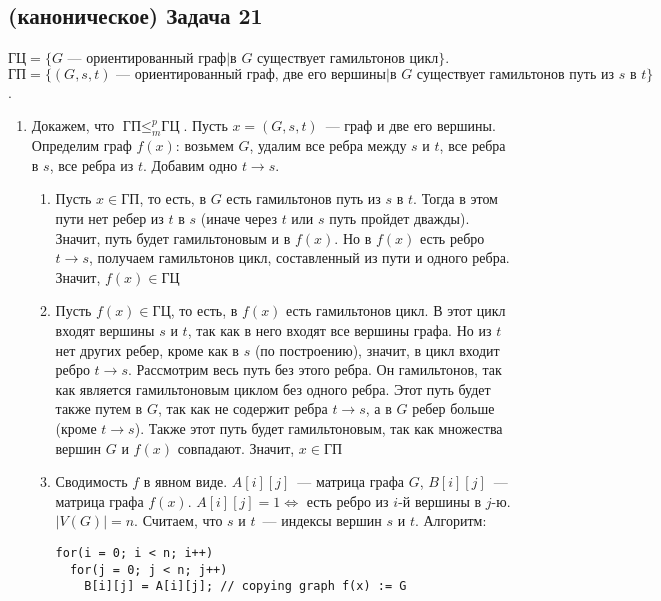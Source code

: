 \documentclass[a4paper]{article}
\def\GC{{\mbox{ГЦ}}}
\def\GP{{\mbox{ГП}}}
\begin{document}
\subsection*{(каноническое) Задача 21}
$\GC=\{G\mbox{~--- ориентированный граф}\big|\mbox{в }G\mbox{ существует гамильтонов цикл}\}$.\newline
$\GP=\{(G,s,t)\mbox{~--- ориентированный граф, две его вершины}\big|\mbox{в }G\mbox{ существует гамильтонов путь из }s\mbox{ в }t\}$.\begin{enumerate}
\item Докажем, что $\GP\leqslant_m^p\GC$. Пусть $x=(G,s,t)$~--- граф и две его вершины. Определим граф $f(x)$: возьмем $G$, удалим все ребра между $s$ и $t$, все ребра в $s$, все ребра из $t$. Добавим одно $t\to s$.\begin{enumerate}
\item Пусть $x\in\GP$, то есть, в $G$ есть гамильтонов путь из $s$ в $t$. Тогда в этом пути нет ребер из $t$ в $s$ (иначе через $t$ или $s$ путь пройдет дважды). Значит, путь будет гамильтоновым и в $f(x)$. Но в $f(x)$ есть ребро $t\to s$, получаем гамильтонов цикл, составленный из пути и одного ребра. Значит, $f(x)\in\GC$
\item Пусть $f(x)\in\GC$, то есть, в $f(x)$ есть гамильтонов цикл. В этот цикл входят вершины $s$ и $t$, так как в него входят все вершины графа. Но из $t$ нет других ребер, кроме как в $s$ (по построению), значит, в цикл входит ребро $t\to s$. Рассмотрим весь путь без этого ребра. Он гамильтонов, так как является гамильтоновым циклом без одного ребра. Этот путь будет также путем в $G$, так как не содержит ребра $t\to s$, а в $G$ ребер больше (кроме $t\to s$). Также этот путь будет гамильтоновым, так как множества вершин $G$ и $f(x)$ совпадают. Значит, $x\in\GP$
\item Сводимость $f$ в явном виде. $A[i][j]$~--- матрица графа $G$, $B[i][j]$~--- матрица графа $f(x)$. $A[i][j]=1\Leftrightarrow $ есть ребро из $i$-й вершины в $j$-ю. $|V(G)|=n$. Считаем, что $s$ и $t$~--- индексы вершин $s$ и $t$. Алгоритм:
\begin{lstlisting}
for(i = 0; i < n; i++)
  for(j = 0; j < n; j++)
    B[i][j] = A[i][j]; // copying graph f(x) := G
	

\end{lstlisting}
\end{enumerate}
\end{enumerate}
\end{document}
